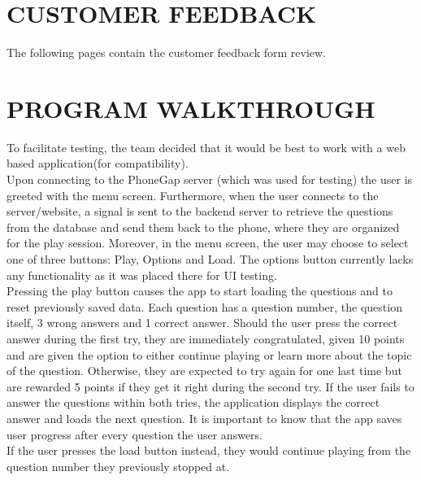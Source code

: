 \documentclass[paper=a4,fontsize=11pt]{article}
\newcommand{\MainSection}[1]{\section*{\uppercase{#1}}}
\begin{document}
\MainSection{Customer Feedback}
The following pages contain the customer feedback form review.




\newpage


\MainSection{Program Walkthrough}
To facilitate testing, the team decided that it would be best to work with a
web based application(for compatibility).\\

\noindent
Upon connecting to the PhoneGap server (which was used for testing) the user is
greeted with the menu screen. Furthermore, when the user connects to the server/website,
a signal is sent to the backend server to retrieve the questions from the database
and send them back to the phone, where they are organized for the play session.
Moreover, in the menu screen, the user may choose to select one of three
buttons: Play, Options and Load. The options button currently lacks any functionality
as it was placed there for UI testing.\\

\noindent
Pressing the play button causes the app to start loading the questions and to reset previously saved data.
Each question has a question number, the question itself, 3 wrong answers and 1 correct answer.
Should the user press the correct answer during the first try, they are immediately
congratulated, given 10 points and are given the option to either continue playing
or learn more about the topic of the question. Otherwise, they are expected to try
again for one last time but are rewarded 5 points if they get it right during the
second try. If the user fails to answer the questions within both tries, the application
displays the correct answer and loads the next question. It is important to know
that the app saves user progress after every question the user answers.\\

\noindent
If the user presses the load button instead, they would continue playing from the question
number they previously stopped at.

\end{document}
